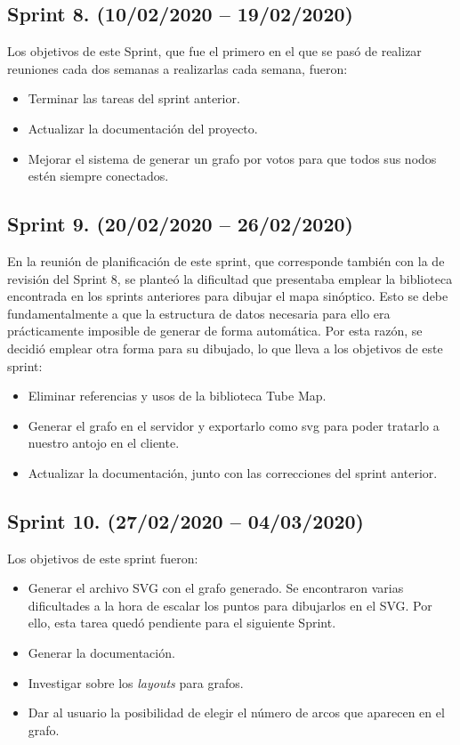 \subsection{Sprint 8. (10/02/2020 -- 19/02/2020)}
Los objetivos de este Sprint, que fue el primero en el que se pasó de realizar reuniones cada dos semanas a realizarlas cada semana, fueron:
\begin{itemize}
	\item Terminar las tareas del sprint anterior.
	\item Actualizar la documentación del proyecto.
	\item Mejorar el sistema de generar un grafo por votos para que todos sus nodos estén siempre conectados.
\end{itemize}

\subsection{Sprint 9. (20/02/2020 -- 26/02/2020)}
En la reunión de planificación de este sprint, que corresponde también con la de revisión del Sprint 8, se planteó la dificultad que presentaba emplear la biblioteca encontrada en los sprints anteriores para dibujar el mapa sinóptico. Esto se debe fundamentalmente a que la estructura de datos necesaria para ello era prácticamente imposible de generar de forma automática.
Por esta razón, se decidió emplear otra forma para su dibujado, lo que lleva a los objetivos de este sprint:
\begin{itemize}
	\item Eliminar referencias y usos de la biblioteca Tube Map.
	\item Generar el grafo en el servidor y exportarlo como svg para poder tratarlo a nuestro antojo en el cliente.
	\item Actualizar la documentación, junto con las correcciones del sprint anterior.
\end{itemize}

\subsection{Sprint 10. (27/02/2020 -- 04/03/2020)}
Los objetivos de este sprint fueron:
\begin{itemize}
	\item Generar el archivo SVG con el grafo generado. Se encontraron varias dificultades a la hora de escalar los puntos para dibujarlos en el SVG. Por ello, esta tarea quedó pendiente para el siguiente Sprint.
	\item Generar la documentación.
	\item Investigar sobre los \textit{layouts} para grafos.
	\item Dar al usuario la posibilidad de elegir el número de arcos que aparecen en el grafo.
\end{itemize}

